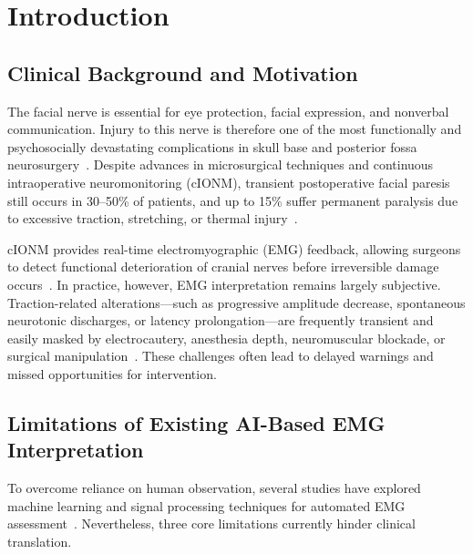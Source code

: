 \documentclass[10pt]{article}
\begin{document}
\section{Introduction}

\subsection{Clinical Background and Motivation}

The facial nerve is essential for eye protection, facial expression, and nonverbal communication. Injury to this nerve is therefore one of the most functionally and psychosocially devastating complications in skull base and posterior fossa neurosurgery~\cite{kartush1992,Samii2021_FacialNerveMechanics}. Despite advances in microsurgical techniques and continuous intraoperative neuromonitoring (cIONM), transient postoperative facial paresis still occurs in 30–50\% of patients, and up to 15\% suffer permanent paralysis due to excessive traction, stretching, or thermal injury~\cite{kim2019,FacialNerve_EMG_Prognosis_2022,FacialNerve_cIONM_Review_2024}. 

cIONM provides real-time electromyographic (EMG) feedback, allowing surgeons to detect functional deterioration of cranial nerves before irreversible damage occurs~\cite{Thyroid_cIONM_Guideline_2018}. In practice, however, EMG interpretation remains largely subjective. Traction-related alterations—such as progressive amplitude decrease, spontaneous neurotonic discharges, or latency prolongation—are frequently transient and easily masked by electrocautery, anesthesia depth, neuromuscular blockade, or surgical manipulation~\cite{FreeRunning_EMG_Risk_2022,IONM_Review_2023}. These challenges often lead to delayed warnings and missed opportunities for intervention.

\subsection{Limitations of Existing AI-Based EMG Interpretation}

To overcome reliance on human observation, several studies have explored machine learning and signal processing techniques for automated EMG assessment~\cite{DeepLearning_SurfEMG_Review_2021}. Nevertheless, three core limitations currently hinder clinical translation.
\end{document}
